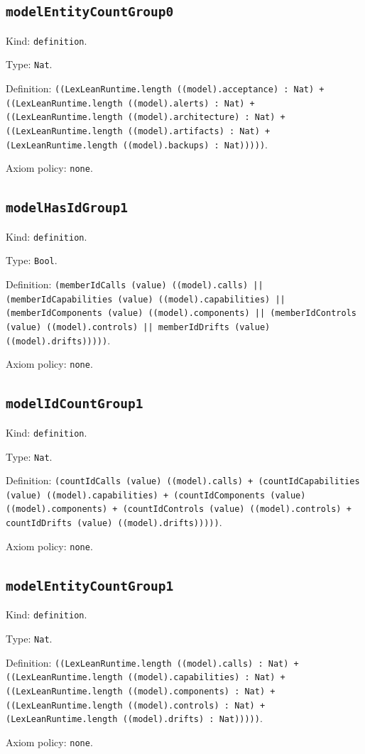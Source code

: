 \documentclass[11pt]{article}
\begin{document}
\subsection*{\texttt{modelEntityCountGroup0}}
\noindent Kind: \texttt{definition}.\par
\noindent Type: \texttt{Nat}.\par
\noindent Definition: \texttt{((LexLeanRuntime.length ((model).acceptance) : Nat) + ((LexLeanRuntime.length ((model).alerts) : Nat) + ((LexLeanRuntime.length ((model).architecture) : Nat) + ((LexLeanRuntime.length ((model).artifacts) : Nat) + (LexLeanRuntime.length ((model).backups) : Nat)))))}.\par
\noindent Axiom policy: \texttt{none}.\par
\subsection*{\texttt{modelHasIdGroup1}}
\noindent Kind: \texttt{definition}.\par
\noindent Type: \texttt{Bool}.\par
\noindent Definition: \texttt{(memberIdCalls (value) ((model).calls) || (memberIdCapabilities (value) ((model).capabilities) || (memberIdComponents (value) ((model).components) || (memberIdControls (value) ((model).controls) || memberIdDrifts (value) ((model).drifts)))))}.\par
\noindent Axiom policy: \texttt{none}.\par
\subsection*{\texttt{modelIdCountGroup1}}
\noindent Kind: \texttt{definition}.\par
\noindent Type: \texttt{Nat}.\par
\noindent Definition: \texttt{(countIdCalls (value) ((model).calls) + (countIdCapabilities (value) ((model).capabilities) + (countIdComponents (value) ((model).components) + (countIdControls (value) ((model).controls) + countIdDrifts (value) ((model).drifts)))))}.\par
\noindent Axiom policy: \texttt{none}.\par
\subsection*{\texttt{modelEntityCountGroup1}}
\noindent Kind: \texttt{definition}.\par
\noindent Type: \texttt{Nat}.\par
\noindent Definition: \texttt{((LexLeanRuntime.length ((model).calls) : Nat) + ((LexLeanRuntime.length ((model).capabilities) : Nat) + ((LexLeanRuntime.length ((model).components) : Nat) + ((LexLeanRuntime.length ((model).controls) : Nat) + (LexLeanRuntime.length ((model).drifts) : Nat)))))}.\par
\noindent Axiom policy: \texttt{none}.\par
\end{document}
